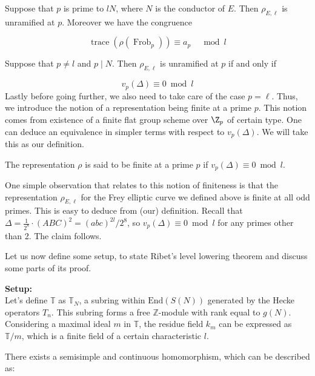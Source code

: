 \begin{proposition}
     Suppose that $p$ is prime to $l N$, where $N$ is the conductor of $E$. Then $\rho_{E, \ell}$ is unramified at $p$. Moreover we have the congruence

$$
\operatorname{trace}\left(\rho\left(\operatorname{Frob}_{p}\right)\right) \equiv a_{p} \quad \bmod l
$$

\begin{proposition}
    Suppose that $p \neq l$ and $p \mid N$. Then $\rho_{E, \ell}$ is unramified at $p$ if and only if

$$
v_{p}(\Delta) \equiv 0 \bmod l
$$
Lastly before going further, we also need to take care of the case $p=\ell$. Thus, we introduce the notion of a representation being finite at a prime $p$. This notion comes from existence of a finite flat group scheme over $\Z_p$ of certain type. One can deduce an equivalence in simpler terms with respect to $v_p(\Delta)$. We will take this as our definition.
\begin{definition}
    The representation $\rho$ is said to be finite at a prime $p$ if $v_{p}(\Delta) \equiv 0 \bmod l$.

\end{definition}

\begin{remark}\label{prf}
 One simple observation that relates to this notion of finiteness is that the representation $\rho_{E, \ell}$ for the Frey elliptic curve we defined above is finite at all odd primes. This is easy to deduce from (our) definition. 
 Recall that $\Delta=\frac{1}{2^{8}} \cdot(A B C)^{2}=(a b c)^{2 l} / 2^{8}$, so $v_{p}(\Delta) \equiv 0 \bmod l$ for any primes other than 2. The claim follows.    
   
\end{remark}
 
Let us now define some setup, to state Ribet's level lowering theorem and discuss some parts of its proof. 

\textbf{Setup:} \\
Let's define \( \mathbb{T} \) as \( \mathbb{T}_{N} \), a subring within \( \text{End}(S(N)) \) generated by the Hecke operators \( T_{n} \). This subring forms a free \( \mathbb{Z} \)-module with rank equal to \( g(N) \). Considering a maximal ideal \( m \) in \( \mathbb{T} \), the residue field \( k_{m} \) can be expressed as \( \mathbb{T} / m \), which is a finite field of a certain characteristic \( l \).

There exists a semisimple and continuous homomorphism, which can be described as:


\end{proposition}
\end{proposition}
